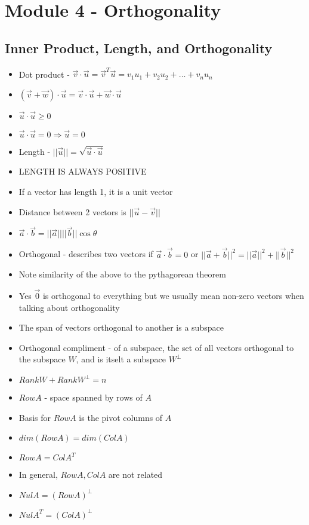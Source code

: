 \documentclass{article}
\begin{document}
\section{Module 4 - Orthogonality}

\subsection{Inner Product, Length, and Orthogonality}
\begin{itemize}
    \item Dot product - \(\vec{v}\cdot\vec{u}=\vec{v}^T\vec{u}=v_1u_1+v_2u_2+\dots+v_nu_n\)
    \item \((\vec{v}+\vec{w})\cdot\vec{u}=\vec{v}\cdot\vec{u}+\vec{w}\cdot\vec{u}\)
    \item \(\vec{u}\cdot\vec{u}\geq 0\)
    \item \(\vec{u}\cdot\vec{u}=0\Rightarrow \vec{u}=0\)
    \item Length - \(||\vec{u}||=\sqrt{\vec{u}\cdot\vec{u}}\)
    \item LENGTH IS ALWAYS POSITIVE 
    \item If a vector has length 1, it is a unit vector 
    \item Distance between 2 vectors is \(||\vec{u}-\vec{v}||\)
    \item \(\vec{a}\cdot\vec{b}=||\vec{a}||||\vec{b}||\cos{\theta}\)
    \item Orthogonal - describes two vectors if \(\vec{a}\cdot\vec{b}=0\) or \(||\vec{a}+\vec{b}||^2=||\vec{a}||^2+||\vec{b}||^2\)
    \item Note similarity of the above to the pythagorean theorem 
    \item Yes \(\vec{0}\) is orthogonal to everything but we usually mean non-zero vectors when talking about orthogonality 
    \item The span of vectors orthogonal to another is a subspace
    \item Orthogonal compliment - of a subspace, the set of all vectors orthogonal to the subspace \(W\), and is itselt a subspace \(W^{\perp}\)
    \item \(Rank W+Rank W^{\perp}=n\) 
    \item \(Row A\) - space spanned by rows of \(A\) 
    \item Basis for \(Row A\) is the pivot columns of \(A\)
    \item \(dim(Row A)=dim(Col A)\)
    \item \(Row A = Col A^T\)
    \item In general, \(Row A, Col A\) are not related
    \item \(Nul A=(Row A)^{\perp}\)
    \item \(Nul A^T =(Col A )^{\perp}\)
\end{itemize}
\end{document}
